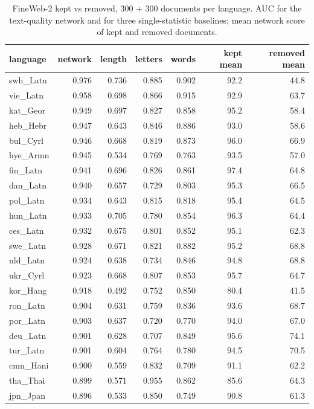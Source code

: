 \begin{table}[t]\centering\footnotesize
\caption{FineWeb-2 kept vs removed, 300 + 300 documents per language. AUC for the
text-quality network and for three single-statistic baselines; mean network score of
kept and removed documents.}
\label{tab:fineweb}
\begin{tabular}{lrrrrrr}
\toprule
language & network & length & letters & words & kept mean & removed mean \\
\midrule
swh\_Latn & 0.976 & 0.736 & 0.885 & 0.902 & 92.2 & 44.8 \\
vie\_Latn & 0.958 & 0.698 & 0.866 & 0.915 & 92.9 & 63.7 \\
kat\_Geor & 0.949 & 0.697 & 0.827 & 0.858 & 95.2 & 58.4 \\
heb\_Hebr & 0.947 & 0.643 & 0.846 & 0.886 & 93.0 & 58.6 \\
bul\_Cyrl & 0.946 & 0.668 & 0.819 & 0.873 & 96.0 & 66.9 \\
hye\_Armn & 0.945 & 0.534 & 0.769 & 0.763 & 93.5 & 57.0 \\
fin\_Latn & 0.941 & 0.696 & 0.826 & 0.861 & 97.4 & 64.8 \\
dan\_Latn & 0.940 & 0.657 & 0.729 & 0.803 & 95.3 & 66.5 \\
pol\_Latn & 0.934 & 0.643 & 0.815 & 0.818 & 95.4 & 64.5 \\
hun\_Latn & 0.933 & 0.705 & 0.780 & 0.854 & 96.3 & 64.4 \\
ces\_Latn & 0.932 & 0.675 & 0.801 & 0.852 & 95.1 & 62.3 \\
swe\_Latn & 0.928 & 0.671 & 0.821 & 0.882 & 95.2 & 68.8 \\
nld\_Latn & 0.924 & 0.638 & 0.734 & 0.846 & 94.8 & 68.8 \\
ukr\_Cyrl & 0.923 & 0.668 & 0.807 & 0.853 & 95.7 & 64.7 \\
kor\_Hang & 0.918 & 0.492 & 0.752 & 0.850 & 80.4 & 41.5 \\
ron\_Latn & 0.904 & 0.631 & 0.759 & 0.836 & 93.6 & 68.7 \\
por\_Latn & 0.903 & 0.637 & 0.720 & 0.770 & 94.0 & 67.0 \\
deu\_Latn & 0.901 & 0.628 & 0.707 & 0.849 & 95.6 & 74.1 \\
tur\_Latn & 0.901 & 0.604 & 0.764 & 0.780 & 94.5 & 70.5 \\
cmn\_Hani & 0.900 & 0.559 & 0.832 & 0.709 & 91.1 & 62.2 \\
tha\_Thai & 0.899 & 0.571 & 0.955 & 0.862 & 85.6 & 64.3 \\
jpn\_Jpan & 0.896 & 0.533 & 0.850 & 0.749 & 90.8 & 61.3 \\

\end{tabular}
\end{table}
